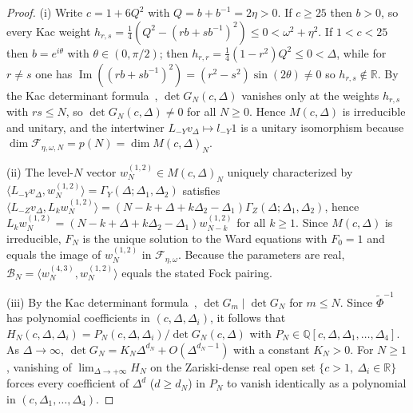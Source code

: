\documentclass[twoside,10pt]{article}
\numberwithin{equation}{section}
\theoremstyle{slbody}
\theoremstyle{definition}
\theoremstyle{remark}
\begin{document}
\begin{proof}
(i) Write \(c=1+6Q^2\) with \(Q=b+b^{-1}=2\eta>0\).  If \(c\geq25\) then
\(b>0\), so every Kac weight
\(h_{r,s}=\frac14(Q^2-(rb+sb^{-1})^2)\leq0<\omega^2+\eta^2\).  If
\(1<c<25\) then \(b=e^{i\theta}\) with \(\theta\in(0,\pi/2)\); then
\(h_{r,r}=\frac14(1-r^2)Q^2\leq0<\Delta\), while for \(r\neq s\) one has
\(\operatorname{Im}((rb+sb^{-1})^2)=(r^2-s^2)\sin(2\theta)\neq0\) so
\(h_{r,s}\notin\mathbb R\).  By the Kac determinant
formula~\cite[Theorem~4.2]{IoharaKoga2011}, \(\det G_N(c,\Delta)\) vanishes
only at the weights \(h_{r,s}\) with \(rs\leq N\), so
\(\det G_N(c,\Delta)\neq0\) for all \(N\geq0\).  Hence \(M(c,\Delta)\) is
irreducible and unitary, and the
intertwiner \(L_{-Y}v_\Delta\mapsto l_{-Y}1\) is a unitary isomorphism
because \(\dim\mathcal F_{\eta,\omega,N}=p(N)=\dim M(c,\Delta)_N\).

(ii) The level-\(N\) vector \(w_N^{(1,2)}\in M(c,\Delta)_N\) uniquely
characterized by \(\langle L_{-Y}v_\Delta,w_N^{(1,2)}\rangle
=\Gamma_Y(\Delta;\Delta_1,\Delta_2)\) satisfies
\(\langle L_{-Z}v_\Delta,L_kw_N^{(1,2)}\rangle
=(N-k+\Delta+k\Delta_2-\Delta_1)\Gamma_Z(\Delta;\Delta_1,\Delta_2)\), hence
\(L_k w_N^{(1,2)}=(N-k+\Delta+k\Delta_2-\Delta_1)w_{N-k}^{(1,2)}\) for all
\(k\geq1\).  Since \(M(c,\Delta)\) is irreducible, \(F_N\) is the unique
solution to the Ward equations with \(F_0=1\) and equals the image of
\(w_N^{(1,2)}\) in \(\mathcal F_{\eta,\omega}\).  Because the parameters are
real, \(\mathcal B_N=\langle w_N^{(4,3)},w_N^{(1,2)}\rangle\) equals the
stated Fock pairing.

(iii) By the Kac determinant formula~\cite[Theorem~4.2, (4.16) and
(4.21)]{IoharaKoga2011}, \(\det G_m\mid\det G_N\) for
\(m\leq N\).  Since \(\widetilde\Phi^{-1}\) has polynomial coefficients in
\((c,\Delta,\Delta_i)\), it follows that
\(H_N(c,\Delta,\Delta_i)=P_N(c,\Delta,\Delta_i)/\det G_N(c,\Delta)\) with
\(P_N\in\mathbb Q[c,\Delta,\Delta_1,\dots,\Delta_4]\).  As
\(\Delta\to\infty\), \(\det G_N=K_N\Delta^{d_N}+O(\Delta^{d_N-1})\) with a
constant \(K_N>0\).  For
\(N\geq1\), vanishing of \(\lim_{\Delta\to+\infty}H_N\) on the
Zariski-dense real open set \(\{c>1,\ \Delta_i\in\mathbb R\}\) forces every
coefficient of \(\Delta^d\) (\(d\geq d_N\)) in \(P_N\) to vanish
identically as a polynomial in \((c,\Delta_1,\dots,\Delta_4)\).
\end{proof}
\end{document}

